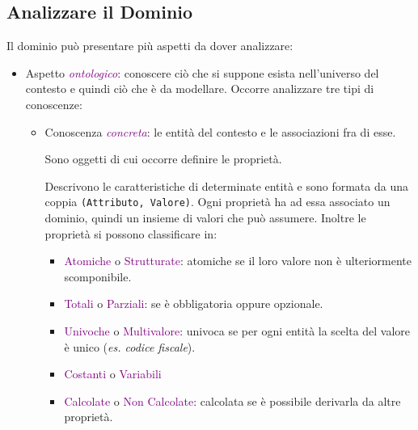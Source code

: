 \subsection{Analizzare il Dominio}
Il dominio può presentare più aspetti da dover analizzare:
\begin{itemize}
    \item Aspetto \emph{\textcolor{purple}{ontologico}}: conoscere ciò che si suppone esista nell'universo del contesto e quindi ciò che è da modellare.
        Occorre analizzare tre tipi di conoscenze:
        \begin{itemize}
            \item Conoscenza \emph{\textcolor{purple}{concreta}}: le entità del contesto e le associazioni fra di esse.
                \begin{definition}[Entità]
                    Sono oggetti di cui occorre definire le proprietà.
                \end{definition}
                \begin{definition}[Proprietà]
                    Descrivono le caratteristiche di determinate entità e sono formata da una coppia \verb+(Attributo, Valore)+.
                    Ogni proprietà ha ad essa associato un dominio, quindi un insieme di valori che può assumere. Inoltre le proprietà si possono classificare in:
                    \begin{itemize}
                        \item \textcolor{purple}{Atomiche} o \textcolor{purple}{Strutturate}: atomiche se il loro valore non è ulteriormente scomponibile.
                        \item \textcolor{purple}{Totali} o \textcolor{purple}{Parziali}: se è obbligatoria oppure opzionale.
                        \item \textcolor{purple}{Univoche} o \textcolor{purple}{Multivalore}: univoca se per ogni entità la scelta del valore è unico (\emph{es. codice fiscale}).
                        \item \textcolor{purple}{Costanti} o \textcolor{purple}{Variabili}
                        \item \textcolor{purple}{Calcolate} o \textcolor{purple}{Non Calcolate}: calcolata se è possibile derivarla da altre proprietà.
                    \end{itemize}
                \end{definition}
                \begin{definition}

\end{definition}
\end{itemize}
\end{itemize}
